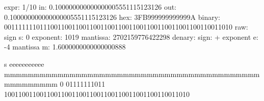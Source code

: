     expr:   1/10
    in:     0.100000000000000005551115123126
    out:    0.100000000000000005551115123126
    hex:    3FB999999999999A
    binary: 0011111110111001100110011001100110011001100110011001100110011010
    raw:    sign s: 0  exponent:   1019  mantissa:        2702159776422298
    denary: sign:   +  exponent e:   -4  mantissa m: 1.6000000000000000888

    s eeeeeeeeeee mmmmmmmmmmmmmmmmmmmmmmmmmmmmmmmmmmmmmmmmmmmmmmmmmmmm
    0 01111111011 1001100110011001100110011001100110011001100110011010

